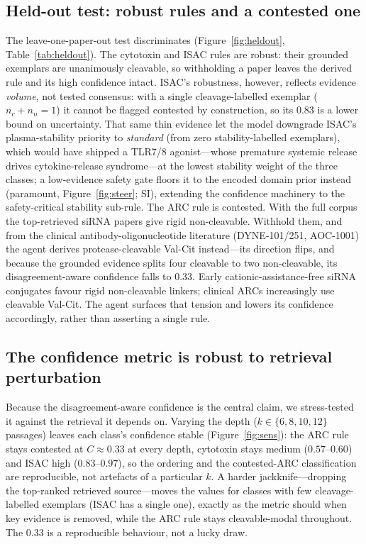 \documentclass[10pt]{article}
\begin{document}
\subsection{Held-out test: robust rules and a contested one}
The leave-one-paper-out test discriminates (Figure~\ref{fig:heldout}, Table~\ref{tab:heldout}). The cytotoxin and ISAC rules are robust: their grounded exemplars are unanimously cleavable, so withholding a paper leaves the derived rule and its high confidence intact. ISAC's robustness, however, reflects evidence \emph{volume}, not tested consensus: with a single cleavage-labelled exemplar ($n_c{+}n_n{=}1$) it cannot be flagged contested by construction, so its 0.83 is a lower bound on uncertainty. That same thin evidence let the model downgrade ISAC's plasma-stability priority to \emph{standard} (from zero stability-labelled exemplars), which would have shipped a TLR7/8 agonist---whose premature systemic release drives cytokine-release syndrome---at the lowest stability weight of the three classes; a low-evidence safety gate floors it to the encoded domain prior instead (paramount, Figure~\ref{fig:steer}; SI), extending the confidence machinery to the safety-critical stability sub-rule. The ARC rule is contested. With the full corpus the top-retrieved siRNA papers give rigid non-cleavable. Withhold them, and from the clinical antibody-oligonucleotide literature (DYNE-101/251, AOC-1001) the agent derives protease-cleavable Val-Cit instead---its direction flips, and because the grounded evidence splits four cleavable to two non-cleavable, its disagreement-aware confidence falls to 0.33. Early cationic-assistance-free siRNA conjugates favour rigid non-cleavable linkers; clinical ARCs increasingly use cleavable Val-Cit. The agent surfaces that tension and lowers its confidence accordingly, rather than asserting a single rule.

\subsection{The confidence metric is robust to retrieval perturbation}
Because the disagreement-aware confidence is the central claim, we stress-tested it against the retrieval it depends on. Varying the depth ($k\in\{6,8,10,12\}$ passages) leaves each class's confidence stable (Figure~\ref{fig:sens}): the ARC rule stays contested at $C\approx0.33$ at every depth, cytotoxin stays medium ($0.57$--$0.60$) and ISAC high ($0.83$--$0.97$), so the ordering and the contested-ARC classification are reproducible, not artefacts of a particular $k$. A harder jackknife---dropping the top-ranked retrieved source---moves the values for classes with few cleavage-labelled exemplars (ISAC has a single one), exactly as the metric should when key evidence is removed, while the ARC rule stays cleavable-modal throughout. The 0.33 is a reproducible behaviour, not a lucky draw.
\end{document}
